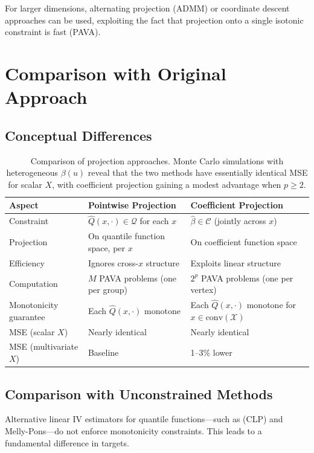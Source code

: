 \documentclass[12pt]{article}
\newcommand{\calQ}{\mathcal{Q}}
\begin{document}
For larger dimensions, alternating projection (ADMM) or coordinate descent approaches can be used, exploiting the fact that projection onto a single isotonic constraint is fast (PAVA).

\section{Comparison with Original Approach}

\subsection{Conceptual Differences}

\begin{table}[h]
\centering
\begin{tabular}{p{3cm}|p{5.5cm}|p{5.5cm}}
\hline
\textbf{Aspect} & \textbf{Pointwise Projection} & \textbf{Coefficient Projection} \\
\hline
Constraint & $\hat{Q}(x,\cdot) \in \calQ$ for each $x$ & $\hat{\beta} \in \mathcal{C}$ (jointly across $x$) \\
\hline
Projection & On quantile function space, per $x$ & On coefficient function space \\
\hline
Efficiency & Ignores cross-$x$ structure & Exploits linear structure \\
\hline
Computation & $M$ PAVA problems (one per group) & $2^p$ PAVA problems (one per vertex) \\
\hline
Monotonicity guarantee & Each $\hat{Q}(x,\cdot)$ monotone & Each $\hat{Q}(x,\cdot)$ monotone for $x \in \text{conv}(\mathcal{X})$ \\
\hline
MSE (scalar $X$) & Nearly identical & Nearly identical \\
\hline
MSE (multivariate $X$) & Baseline & 1--3\% lower \\
\hline
\end{tabular}
\caption{Comparison of projection approaches. Monte Carlo simulations with heterogeneous $\beta(u)$ reveal that the two methods have essentially identical MSE for scalar $X$, with coefficient projection gaining a modest advantage when $p \geq 2$.}
\end{table}

\subsection{Comparison with Unconstrained Methods}

Alternative linear IV estimators for quantile functions---such as \cite{chetverikov2016iv} (CLP) and Melly-Pons---do not enforce monotonicity constraints. This leads to a fundamental difference in targets.
\end{document}
